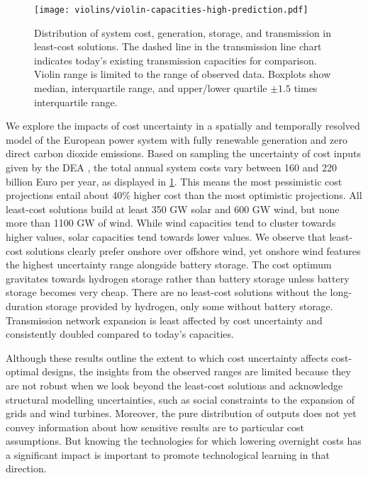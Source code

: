 
\begin{figure}
    \centering
    \texttt{[image: violins/violin-capacities-high-prediction.pdf]}
    \caption{
      Distribution of system cost, generation, storage, and transmission
      in least-cost solutions. The dashed line in the
      transmission line chart indicates today's existing transmission
      capacities for comparison. Violin range is limited to the range of observed data.
      Boxplots show median, interquartile range, and upper/lower quartile $\pm 1.5$ times interquartile range.
    }
    \label{fig:violin}
\end{figure}

We explore the impacts of cost uncertainty in a spatially and temporally
resolved model of the European power system with fully renewable generation and
zero direct carbon dioxide emissions. Based on sampling the uncertainty of cost
inputs given by the DEA \cite{DEA}, the total annual system costs vary between
160 and 220 billion Euro per year, as displayed in \cref{fig:violin}. This means
the most pessimistic cost projections entail about 40\% higher cost than the
most optimistic projections. All least-cost solutions build at least 350 GW
solar and 600 GW wind, but none more than 1100 GW of wind. While wind capacities
tend to cluster towards higher values, solar capacities tend towards lower
values. We observe that least-cost solutions clearly prefer onshore over
offshore wind, yet onshore wind features the highest uncertainty range alongside
battery storage. The cost optimum gravitates towards hydrogen storage rather
than battery storage unless battery storage becomes very cheap. There are no
least-cost solutions without the long-duration storage provided by hydrogen,
only some without battery storage. Transmission network expansion is least
affected by cost uncertainty and consistently doubled compared to today's
capacities.

Although these results outline the extent to which cost uncertainty affects
cost-optimal designs, the insights from the observed ranges are limited because
they are not robust when we look beyond the least-cost solutions and acknowledge
structural modelling uncertainties, such as social constraints to the expansion
of grids and wind turbines. Moreover, the pure distribution of outputs does not
yet convey information about how sensitive results are to particular cost
assumptions. But knowing the technologies for which lowering overnight costs has
a significant impact is important to promote technological learning in that
direction.

